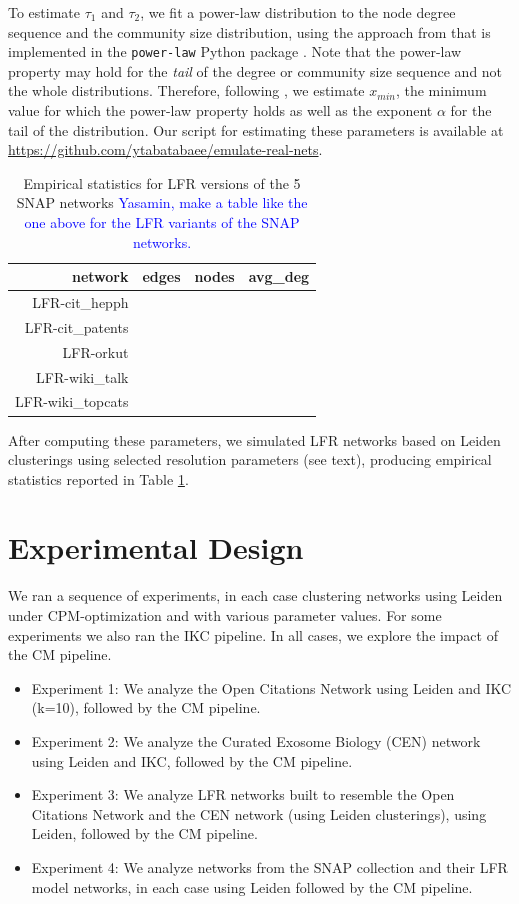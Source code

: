 \documentclass[11pt]{article}   	%
\begin{document}
To estimate $\tau_1$ and $\tau_2$, we fit a power-law distribution to the node degree sequence and the community size distribution, using the approach from \cite{clauset2009power} that is implemented in the \texttt{power-law} Python package \citep{alstott2014powerlaw}. Note that the power-law property may hold for the \textit{tail} of the degree or community size sequence and not the whole distributions. Therefore, following \cite{clauset2009power}, we estimate $x_{min}$, the minimum value for which the power-law property holds as well as the exponent $\alpha$ for the tail of the distribution. Our script for estimating these parameters is available at \href{https://github.com/ytabatabaee/emulate-real-nets}{https://github.com/ytabatabaee/emulate-real-nets}.


\begin{table}[ht]
\centering
\begin{tabular}{rrrr}
  \hline
 network & edges & nodes & avg\_deg \\
  \hline
 LFR-cit\_hepph &  &  &  \\
 LFR-cit\_patents &&& \\
  LFR-orkut &&& \\
  LFR-wiki\_talk &&& \\
  LFR-wiki\_topcats &&& \\
   \hline
\end{tabular}
\caption{Empirical statistics for LFR versions of the  5 SNAP networks  \textcolor{blue}{Yasamin, make a table like the one above for the LFR variants of the SNAP networks.}}
\label{tab:empirical-stats-LFR-SNAP}
\end{table}
After computing these parameters, we simulated LFR networks based on Leiden clusterings using selected resolution parameters (see text), producing empirical statistics reported in Table \ref{tab:empirical-stats-LFR-SNAP}.

\section{Experimental Design}
\label{sec:expt-design}
We ran a sequence of experiments, in each case clustering networks using Leiden under CPM-optimization and with various parameter values. For some experiments we also ran the IKC pipeline.  In all cases, we explore the impact of the CM pipeline.
\begin{itemize}
\item Experiment 1: We analyze the Open Citations Network using Leiden  and IKC (k=10), followed by the CM pipeline.
\item Experiment 2: We analyze the Curated Exosome Biology (CEN) network using Leiden and IKC, followed by the CM pipeline.
\item Experiment 3: We analyze LFR networks built to resemble the Open Citations Network and the CEN network (using Leiden clusterings), using Leiden, followed by the CM pipeline.
\item Experiment 4: We analyze networks from the SNAP collection and their LFR model networks, in each case using Leiden followed by the CM pipeline.
\end{itemize}
\end{document}

